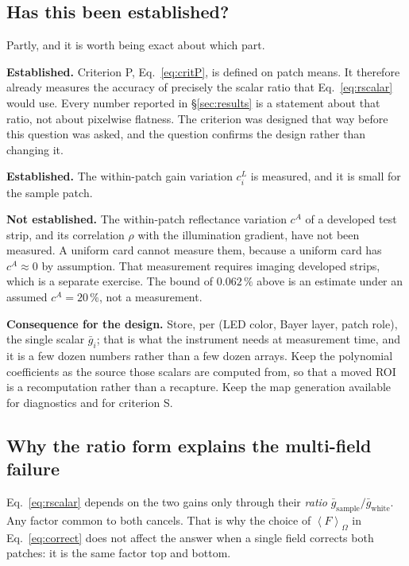 \documentclass[11pt, a4paper]{article}
\newcommand{\pct}{\,\%}
\newcommand{\mean}[2]{\left\langle #1 \right\rangle_{#2}}
\begin{document}
\subsection{Has this been established?}

Partly, and it is worth being exact about which part.

\textbf{Established.}
Criterion P, Eq.~\ref{eq:critP}, is defined on patch means.
It therefore already measures the accuracy of precisely the scalar ratio
that Eq.~\ref{eq:rscalar} would use.
Every number reported in \S\ref{sec:results} is a statement about
that ratio,
not about pixelwise flatness.
The criterion was designed that way before this question was asked,
and the question confirms the design rather than changing it.

\textbf{Established.}
The within-patch gain variation $c^{L}_i$ is measured, and it is small
for the sample patch.

\textbf{Not established.}
The within-patch reflectance variation $c^{A}$ of a developed test strip,
and its correlation $\rho$ with the illumination gradient,
have not been measured.
A uniform card cannot measure them,
because a uniform card has $c^{A} \approx 0$ by assumption.
That measurement requires imaging developed strips,
which is a separate exercise.
The bound of $0.062\pct$ above is an estimate under an assumed
$c^{A} = 20\pct$, not a measurement.

\textbf{Consequence for the design.}
Store, per (LED color, Bayer layer, patch role), the single scalar
$\bar{g}_i$;
that is what the instrument needs at measurement time,
and it is a few dozen numbers rather than a few dozen arrays.
Keep the polynomial coefficients as the source those scalars are computed
from, so that a moved ROI is a recomputation rather than a recapture.
Keep the map generation available for diagnostics and for criterion S.

\subsection{Why the ratio form explains the multi-field failure}
\label{sec:whyratio}

Eq.~\ref{eq:rscalar} depends on the two gains only through their
\emph{ratio} $\bar{g}_{\mathrm{sample}}/\bar{g}_{\mathrm{white}}$.
Any factor common to both cancels.
That is why the choice of $\mean{F}{\Omega}$ in Eq.~\ref{eq:correct}
does not affect the answer
when a single field corrects both patches:
it is the same factor top and bottom.
\end{document}
